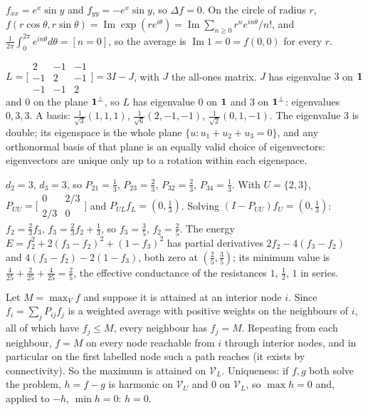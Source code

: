 $f_{xx} = e^x\sin y$ and $f_{yy} = -e^x\sin y$, so $\Delta f = 0$. On the circle of radius $r$, $f(r\cos\theta, r\sin\theta) = \operatorname{Im}\exp(re^{i\theta}) = \operatorname{Im}\sum_{n\geq0}r^ne^{in\theta}/n!$,
and $\frac1{2\pi}\int_0^{2\pi}e^{in\theta}d\theta = [n = 0]$, so the average is $\operatorname{Im}1 = 0 = f(0, 0)$ for every $r$.

$L = \bigl[\begin{smallmatrix}2&-1&-1\\-1&2&-1\\-1&-1&2\end{smallmatrix}\bigr] = 3I - J$, with $J$ the all-ones matrix. $J$ has eigenvalue $3$ on $\mathbf{1}$ and $0$ on the plane $\mathbf{1}^\perp$, so $L$ has
eigenvalue $0$ on $\mathbf{1}$ and $3$ on $\mathbf{1}^\perp$: eigenvalues $0, 3, 3$. A basis: $\frac1{\sqrt3}(1, 1, 1)$, $\frac1{\sqrt6}(2, -1, -1)$, $\frac1{\sqrt2}(0, 1, -1)$. The eigenvalue $3$
is double; its eigenspace is the whole plane $\{u: u_1 + u_2 + u_3 = 0\}$, and any orthonormal basis of that plane is an
equally valid choice of eigenvectors: eigenvectors are unique only up to a rotation within each
eigenspace.

$d_2 = 3$, $d_3 = 3$, so $P_{21} = \frac13$, $P_{23} = \frac23$, $P_{32} = \frac23$, $P_{34} = \frac13$. With $U = \{2, 3\}$, $P_{UU} = \bigl[\begin{smallmatrix}0&2/3\\2/3&0\end{smallmatrix}\bigr]$ and $P_{UL}f_L = (0, \frac13)$. Solving
$(I - P_{UU})f_U = (0, \frac13)$: $f_2 = \frac23f_3$, $f_3 = \frac23f_2 + \frac13$, so $f_3 = \frac35$, $f_2 = \frac25$. The energy $E = f_2^2 + 2(f_3 - f_2)^2 + (1 - f_3)^2$ has partial derivatives
$2f_2 - 4(f_3 - f_2)$ and $4(f_3 - f_2) - 2(1 - f_3)$, both zero at $(\frac25, \frac35)$; its minimum value is $\frac4{25} + \frac2{25} + \frac4{25} = \frac25$, the effective
conductance of the resistances $1$, $\frac12$, $1$ in series.

Let $M = \max_Vf$ and suppose it is attained at an interior node $i$. Since $f_i = \sum_jP_{ij}f_j$ is a weighted average with positive
weights on the neighbours of $i$, all of which have $f_j\leq M$, every neighbour has $f_j = M$. Repeating from each neighbour, $f = M$
on every node reachable from $i$ through interior nodes, and in particular on the first labelled node such
a path reaches (it exists by connectivity). So the maximum is attained on $\mathcal V_L$. Uniqueness: if $f, g$ both solve the
problem, $h = f - g$ is harmonic on $\mathcal V_U$ and $0$ on $\mathcal V_L$, so $\max h = 0$ and, applied to $-h$, $\min h = 0$: $h = 0$.

